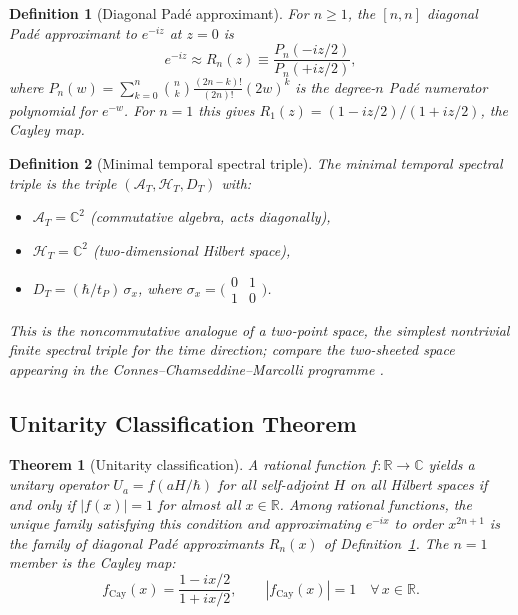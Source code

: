 \documentclass[12pt,a4paper]{article}
\newtheorem{theorem}{Theorem}
\newtheorem{definition}{Definition}
\begin{document}
\begin{definition}[Diagonal Pad\'e approximant]\label{def:pade}
For $n \geq 1$, the $[n,n]$ diagonal Pad\'e approximant to $e^{-iz}$ at $z=0$ is
\begin{equation}
  e^{-iz} \approx R_n(z) \equiv \frac{P_n(-iz/2)}{P_n(+iz/2)},
  \label{eq:pade_def}
\end{equation}
where $P_n(w) = \sum_{k=0}^{n} \binom{n}{k}\frac{(2n-k)!}{(2n)!}(2w)^k$ is the
degree-$n$ Pad\'e numerator polynomial for $e^{-w}$.  For $n=1$ this gives
$R_1(z) = (1 - iz/2)/(1 + iz/2)$, the Cayley map.
\end{definition}

\begin{definition}[Minimal temporal spectral triple]\label{def:spectral_triple}
The \emph{minimal temporal spectral triple} is the triple
$(\mathcal{A}_T, \mathcal{H}_T, D_T)$ with:
\begin{itemize}
  \item $\mathcal{A}_T = \mathbb{C}^2$ (commutative algebra, acts diagonally),
  \item $\mathcal{H}_T = \mathbb{C}^2$ (two-dimensional Hilbert space),
  \item $D_T = (\hbar/t_P)\,\sigma_x$, where
        $\sigma_x = \bigl(\begin{smallmatrix}0&1\\1&0\end{smallmatrix}\bigr)$.
\end{itemize}
This is the noncommutative analogue of a two-point space, the simplest nontrivial
finite spectral triple for the time direction; compare the two-sheeted space appearing
in the Connes--Chamseddine--Marcolli programme \cite{ashtekar2004}.
\end{definition}

\subsection{Unitarity Classification Theorem}
\label{sec:unitarity_thm}

\begin{theorem}[Unitarity classification]\label{thm:unitarity}
A rational function $f : \mathbb{R} \to \mathbb{C}$ yields a unitary operator
$U_a = f(aH/\hbar)$ for \emph{all} self-adjoint $H$ on \emph{all} Hilbert spaces if and
only if $|f(x)| = 1$ for almost all $x \in \mathbb{R}$.  Among rational functions, the
unique family satisfying this condition and approximating $e^{-ix}$ to order $x^{2n+1}$
is the family of diagonal Pad\'e approximants $R_n(x)$ of Definition~\ref{def:pade}.
The $n = 1$ member is the \emph{Cayley map}:
\begin{equation}
  f_{\mathrm{Cay}}(x) = \frac{1 - ix/2}{1 + ix/2}, \qquad |f_{\mathrm{Cay}}(x)| = 1
  \quad \forall\, x \in \mathbb{R}.
  \label{eq:cayley_map}
\end{equation}
\end{theorem}
\end{document}
